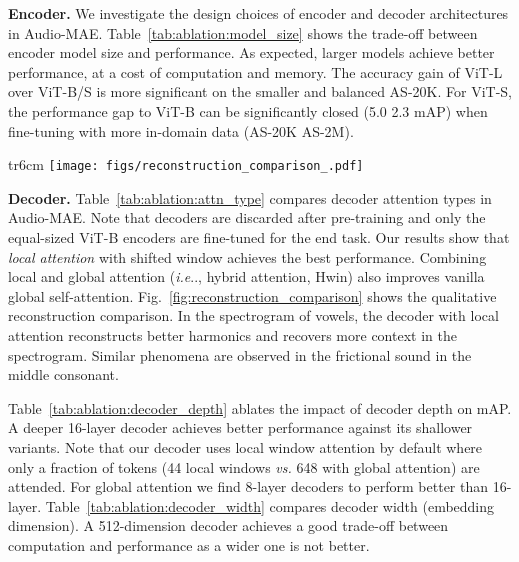 \documentclass{article}
\makeatletter
\DeclareRobustCommand\onedot{\futurelet\@let@token\@onedot}
\def\@onedot{\ifx\@let@token.\else.\null\fi\xspace}
\def\ie{\emph{i.e}\onedot} \def\Ie{\emph{I.e}\onedot}
\renewcommand{\paragraph}[1]{\vspace{1.25mm}\noindent\textbf{#1}}
\makeatother
\begin{document}
\paragraph{Encoder.}
We investigate the design choices of encoder and decoder architectures in Audio-MAE.
Table~\ref{tab:ablation:model_size} shows the trade-off between encoder model size and performance. 
As expected, larger models achieve better performance, at a cost of computation and memory. 
The accuracy gain of ViT-L over ViT-B/S is more significant on the smaller and balanced AS-20K.
For ViT-S, the performance gap to ViT-B can be significantly closed (5.0  2.3 mAP) when fine-tuning with more in-domain data (AS-20K  AS-2M).






\begin{wrapfigure}{tr}{6cm}
\centering
    \texttt{[image: figs/reconstruction\_comparison\_.pdf]}
\caption{\small{Decoder reconstruction comparison.}
    \label{fig:reconstruction_comparison}
    }
\end{wrapfigure}



\paragraph{Decoder.}
Table~\ref{tab:ablation:attn_type} compares decoder attention types in Audio-MAE.
Note that decoders are discarded after pre-training and only the equal-sized ViT-B encoders are fine-tuned for the end task.
Our results show that \textit{local attention} with shifted window achieves the best performance. 
Combining local and global attention (\ie, hybrid attention, Hwin) also improves vanilla global self-attention.
Fig.~\ref{fig:reconstruction_comparison} shows the qualitative reconstruction comparison. 
In the spectrogram of vowels, the decoder with local attention reconstructs better harmonics and recovers more context in the spectrogram. Similar phenomena are observed in the frictional sound in the middle consonant. 






Table~\ref{tab:ablation:decoder_depth} ablates the impact of decoder depth on mAP. 
A deeper 16-layer decoder achieves better performance against its shallower  variants. Note that our decoder uses local window attention by default where only a fraction of tokens (44 local windows \textit{vs.} 648 with global attention) are attended.  For global attention we find 8-layer decoders to perform better than 16-layer.
Table~\ref{tab:ablation:decoder_width} compares decoder width (embedding dimension). A 512-dimension decoder achieves a good trade-off between computation and performance as a wider one is not better.
\end{document}
